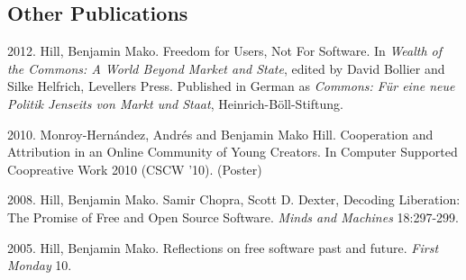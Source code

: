 \documentclass[10pt]{article}
\newenvironment{cvlist}{
\begin{list}{}{\leftmargin=3.0em \itemindent=-3.0em}
  \setlength{\itemsep}{0pt}
  \setlength{\parskip}{0em}
  \setlength{\parsep}{1em}
  \setlength{\parindent}{0em}}
{\vspace{1em}
\end{list}}
\begin{document}


\subsection{Other Publications}
\begin{cvlist}
\item 2012. Hill, Benjamin Mako. Freedom for Users, Not For Software. In \emph{Wealth of the Commons: A World Beyond Market and State}, edited by David Bollier and Silke Helfrich, Levellers Press. Published in German as \emph{Commons: Für eine neue Politik Jenseits von Markt und Staat}, Heinrich-Böll-Stiftung.
\item 2010. Monroy-Hernández, Andrés and Benjamin Mako Hill. Cooperation and Attribution in an Online Community of Young Creators. In Computer Supported Coopreative Work 2010 (CSCW '10). (Poster)
\item 2008. Hill, Benjamin Mako. Samir Chopra, Scott D. Dexter, Decoding Liberation: The Promise of Free and Open Source Software. \emph{Minds and Machines} 18:297-299.

\item 2005. Hill, Benjamin Mako. Reflections on free
  software past and future. \emph{First Monday} 10.

\end{cvlist}
\end{document}
